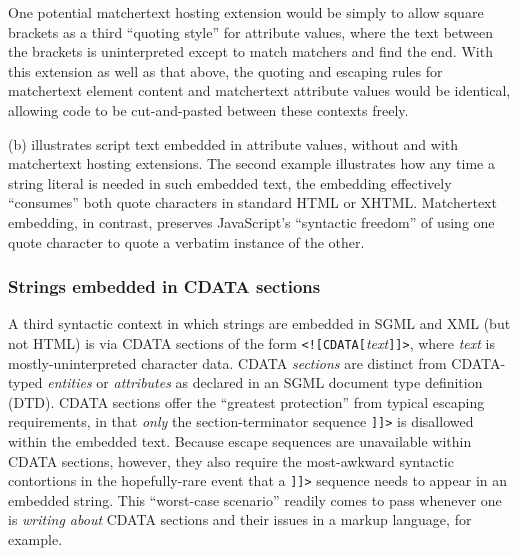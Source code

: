 One potential matchertext hosting extension
would be simply to allow square brackets as a third ``quoting style''
for attribute values,
where the text between the brackets is uninterpreted
except to match matchers and find the end.
With this extension as well as that above,
the quoting and escaping rules for matchertext element content
and matchertext attribute values would be identical,
allowing code to be cut-and-pasted between these contexts freely.

(b) illustrates
script text embedded in attribute values,
without and with matchertext hosting extensions.
The second example illustrates how any time
a string literal is needed in such embedded text,
the embedding effectively ``consumes'' both quote characters
in standard HTML or XHTML.
Matchertext embedding, in contrast,
preserves JavaScript's ``syntactic freedom''
of using one quote character to quote a verbatim instance of the other.


\subsubsection{Strings embedded in CDATA sections}

A third syntactic context in which strings are embedded in SGML and XML
(but not HTML)
is via CDATA sections of the form \verb|<![CDATA[|\emph{text}\verb|]]>|,
where \emph{text} is mostly-uninterpreted character data.
CDATA \emph{sections} are distinct from
CDATA-typed \emph{entities} or \emph{attributes}
as declared in an SGML document type definition (DTD).
CDATA sections offer the ``greatest protection''
from typical \ml escaping requirements,
in that \emph{only} the section-terminator sequence \verb|]]>|
is disallowed within the embedded text.
Because \ml escape sequences are unavailable within CDATA sections, however,
they also require the most-awkward syntactic contortions
in the hopefully-rare event that a \verb|]]>| sequence
needs to appear in an embedded string.
This ``worst-case scenario'' readily comes to pass
whenever one is \emph{writing about} CDATA sections and their issues
in a \ml markup language, for example.

